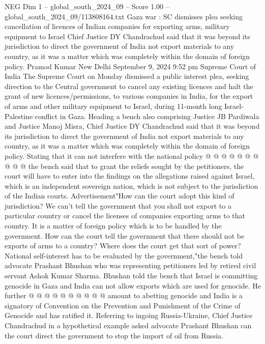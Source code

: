\begin{textsample}{NEG Dim 1 – global\_south\_2024\_09 – Score 1.00 – global\_south\_2024\_09/113808164.txt}  \label{ex:f1_neg_419}
Gaza war : SC dismisses plea seeking cancellation of licences of Indian companies for exporting arms, military equipment to Israel Chief Justice DY Chandrachud said that it was beyond its jurisdiction to direct the government of India not export materials to any country, as it was a matter which was completely within the domain of foreign policy.
Pramod Kumar New Delhi September 9, 2024 9:52 pm Supreme Court of India The Supreme Court on Monday dismissed a public interest plea, seeking direction to the Central government to cancel any existing licences and halt the grant of new licences/permissions, to various companies in India, for the export of arms and other military equipment to Israel, during 11-month long Israel-Palestine conflict in Gaza.
Heading a bench also comprising Justice JB Pardiwala and Justice Manoj Misra, Chief Justice DY Chandrachud said that it was beyond its jurisdiction to direct the government of India not export materials to any country, as it was a matter which was completely within the domain of foreign policy.
Stating that it can not interfere with the national policy @ @ @ @ @ @ @ @ @ @ the bench said that to grant the reliefs sought by the petitioners, the court will have to enter into the findings on the allegations raised against Israel, which is an independent sovereign nation, which is not subject to the jurisdiction of the Indian courts.
Advertisement"How can the court adopt this kind of jurisdiction?
We can't tell the government that you shall not export to a particular country or cancel the licenses of companies exporting arms to that country.
It is a matter of foreign policy which is to be handled by the government.
How can the court tell the government that there should not be exports of arms to a country?
Where does the court get that sort of power?
National self-interest has to be evaluated by the government,"the bench told advocate Prashant Bhushan who was representing petitioners led by retired civil servant Ashok Kumar Sharma.
Bhushan told the bench that Israel is committing genocide in Gaza and India can not allow exports which are used for genocide.
He further @ @ @ @ @ @ @ @ @ @ amount to abetting genocide and India is a signatory of Convention on the Prevention and Punishment of the Crime of Genocide and has ratified it.
Referring to ingoing Russia-Ukraine, Chief Justice Chandrachud in a hypothetical example asked advocate Prashant Bhushan can the court direct the government to stop the import of oil from Russia.

\end{textsample}
